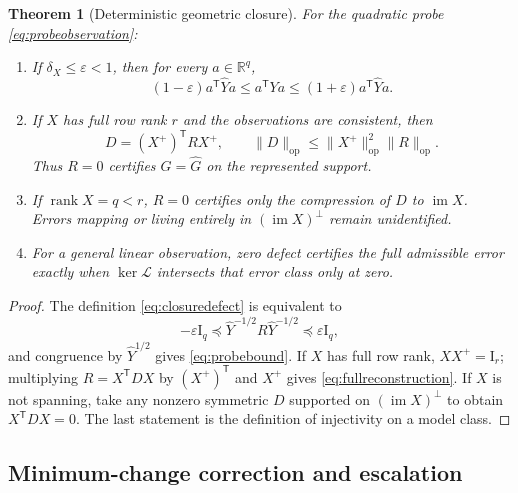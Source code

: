 \documentclass[10pt,twocolumn]{article}
\newtheorem{theorem}{Theorem}[section]
\theoremstyle{definition}
\theoremstyle{remark}
\newcommand{\R}{\mathbb R}
\newcommand{\Id}{\mathrm I}
\newcommand{\im}{\operatorname{im}}
\newcommand{\rank}{\operatorname{rank}}
\newcommand{\op}{\mathrm{op}}
\begin{document}
\begin{theorem}[Deterministic geometric closure]
For the quadratic probe \eqref{eq:probeobservation}:
\begin{enumerate}[label=(\roman*)]
\item If $\delta_X\le\varepsilon<1$, then for every $a\in\R^q$,
\begin{equation}
 (1-\varepsilon)a^{\mathsf T}\widehat Ya
 \le a^{\mathsf T}Ya
 \le(1+\varepsilon)a^{\mathsf T}\widehat Ya.
 \label{eq:probebound}
\end{equation}
\item If $X$ has full row rank $r$ and the observations are consistent, then
\begin{equation}
 D=(X^+)^{\mathsf T}RX^+,\qquad
 \|D\|_{\op}\le\|X^+\|_{\op}^2\|R\|_{\op}.
 \label{eq:fullreconstruction}
\end{equation}
Thus $R=0$ certifies $G=\widehat G$ on the represented support.
\item If $\rank X=q<r$, $R=0$ certifies only the compression of $D$ to $\im X$.  Errors mapping or living entirely in $(\im X)^\perp$ remain unidentified.
\item For a general linear observation, zero defect certifies the full admissible error exactly when $\ker\mathcal L$ intersects that error class only at zero.
\end{enumerate}
\end{theorem}

\begin{proof}
The definition \eqref{eq:closuredefect} is equivalent to
\begin{equation}
 -\varepsilon\Id_q\preceq\widehat Y^{-1/2}R\widehat Y^{-1/2}\preceq\varepsilon\Id_q,
\end{equation}
and congruence by $\widehat Y^{1/2}$ gives \eqref{eq:probebound}.  If $X$ has full row rank, $XX^+=\Id_r$; multiplying $R=X^{\mathsf T}DX$ by $(X^+)^{\mathsf T}$ and $X^+$ gives \eqref{eq:fullreconstruction}.  If $X$ is not spanning, take any nonzero symmetric $D$ supported on $(\im X)^\perp$ to obtain $X^{\mathsf T}DX=0$.  The last statement is the definition of injectivity on a model class.
\end{proof}

\subsection{Minimum-change correction and escalation}
\end{document}
